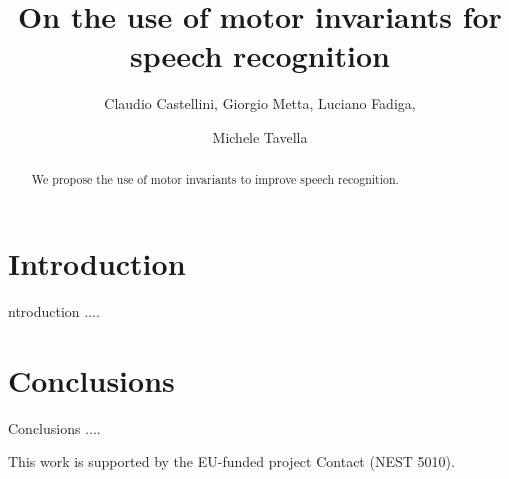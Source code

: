 \documentclass{pnastwo}
\begin{document}
\title{On the use of motor invariants for speech recognition}

\author{
Claudio Castellini,
Giorgio Metta,
Luciano Fadiga, \and
Michele Tavella
}


\maketitle

\begin{article}

\begin{abstract}
We propose the use of motor invariants to improve speech recognition.
\end{abstract}


\section{Introduction}

ntroduction ....

\section{Conclusions}

Conclusions ....


\begin{acknowledgments}
This work is supported by the EU-funded project Contact (NEST 5010).
\end{acknowledgments}

%

\end{article}


\end{document}
